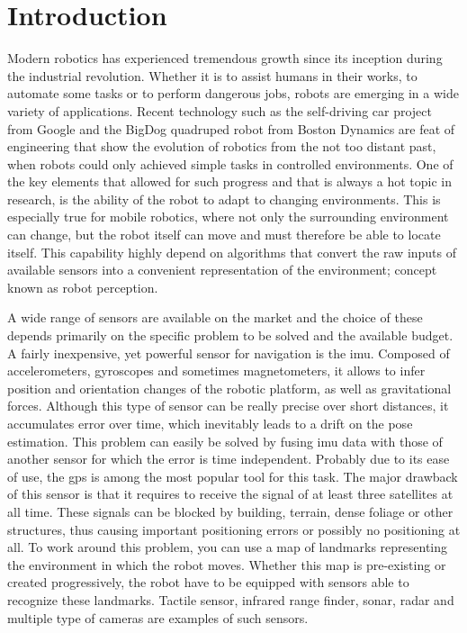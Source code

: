 \chapter*{Introduction} 

Modern robotics has experienced tremendous growth since its inception during the industrial revolution. Whether it is to assist humans in their works, to automate some tasks or to perform dangerous jobs, robots are emerging in a wide variety of applications. Recent technology such as the self-driving car project from Google and the BigDog quadruped robot from Boston Dynamics are feat of engineering that show the evolution of robotics from the not too distant past, when robots could only achieved simple tasks in controlled environments. One of the key elements that allowed for such progress and that is always a hot topic in research, is the ability of the robot to adapt to changing environments. This is especially true for mobile robotics, where not only the surrounding environment can change, but the robot itself can move and must therefore be able to locate itself. This capability highly depend on algorithms that convert the raw inputs of available sensors into a convenient representation of the environment; concept known as robot perception.

A wide range of sensors are available on the market and the choice of these depends primarily on the specific problem to be solved and the available budget. A fairly inexpensive, yet powerful sensor for navigation is the \gls{imu}. Composed of accelerometers, gyroscopes and sometimes magnetometers, it allows to infer position and orientation changes of the robotic platform, as well as gravitational forces. Although this type of sensor can be really precise over short distances, it accumulates error over time, which inevitably leads to a drift on the pose estimation. This problem can easily be solved by fusing \gls{imu} data with those of another sensor for which the error is time independent. Probably due to its ease of use, the \gls{gps} is among the most popular tool for this task. The major drawback of this sensor is that it requires to receive the signal of at least three satellites at all time. These signals can be blocked by building, terrain, dense foliage or other structures, thus causing important positioning errors or possibly no positioning at all. To work around this problem, you can use a map of landmarks representing the environment in which the robot moves. Whether this map is pre-existing or created progressively, the robot have to be equipped with sensors able to recognize these landmarks. Tactile sensor, infrared range finder, \gls{sonar}, \gls{radar} and multiple type of cameras are examples of such sensors.


